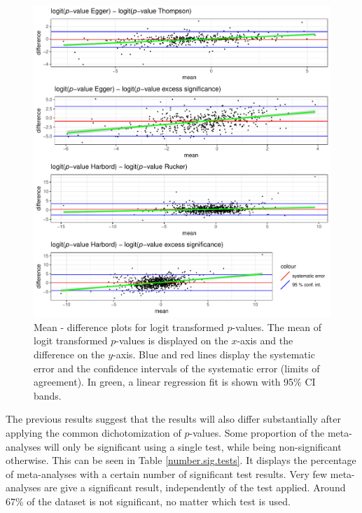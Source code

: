 \documentclass[11pt,a4paper,twoside]{book}\usepackage[]{graphicx}\usepackage[]{color}
\newenvironment{knitrout}{}{} %
\begin{document}
\begin{figure}
\begin{knitrout}
\color{fgcolor}

{\centering \includegraphics[width=\textwidth-3cm]{figure/ch03_figunnamed-chunk-16-1} 

}



\end{knitrout}
\caption{Mean - difference plots for logit transformed $p$-values. The mean of logit transformed $p$-values is displayed on the $x$-axis and the difference on the $y$-axis. Blue and red lines display the systematic error and the confidence intervals of the systematic error (limits of agreement).
In green, a linear regression fit is shown with 95\% CI bands.}
\label{fig:mean.diff.test}
\end{figure}

The previous results suggest that the results will also differ substantially after applying the common dichotomization of $p$-values. Some proportion of the meta-analyses will only be significant using a single test, while being non-significant otherwise. This can be seen in Table \ref{number.sig.tests}. It displays the percentage of meta-analyses with a certain number of significant test results. Very few meta-analyses are give a significant result, independently of the test applied. Around 67\% of the dataset is not significant, no matter which test is used. \\
\end{document}
